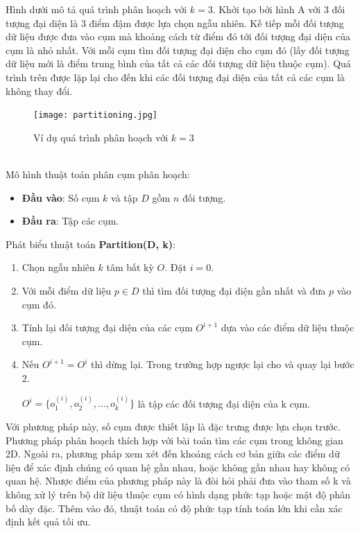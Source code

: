 \documentclass{article}
\begin{document}
    Hình dưới mô tả quá trình phân hoạch với $k=3$. Khởi tạo bởi hình A với 3 đối tượng đại diện là 3 điểm đậm được lựa chọn ngẫu nhiên. Kế tiếp mỗi đối tượng dữ liệu được đưa vào cụm mà khoảng cách từ điểm đó tới đối tượng đại diện của cụm là nhỏ nhất. Với mỗi cụm tìm đối tượng đại diện cho cụm đó (lấy đối tượng dữ liệu mới là điểm trung bình của tất cả các đối tượng dữ liệu thuộc cụm). Quá trình trên được lặp lại cho đến khi các đối tượng đại diện của tất cả các cụm là không thay đổi.
    \begin{figure}[H]
        \centering            \texttt{[image: partitioning.jpg]} \\
        \caption{Ví dụ quá trình phân hoạch với $k = 3$}
        \label{fig:partitioning_ex}
    \end{figure}
    \\
    Mô hình thuật toán phân cụm phân hoạch:
    \begin{itemize}
        \item \textbf{Đầu vào}: Số cụm $k$ và tập $D$ gồm $n$ đối tượng.
        \item \textbf{Đầu ra}: Tập các cụm.
    \end{itemize}
    
    Phát biểu thuật toán \textbf{Partition(D, k)}:
    \begin{enumerate}
        \item Chọn ngẫu nhiên $k$ tâm bất kỳ $O$. Đặt $i=0$.
        \item Với mỗi điểm dữ liệu $p \in D$ thì tìm đối tượng đại diện gần nhất và đưa $p$ vào cụm đó.
        \item Tính lại đối tượng đại diện của các cụm $O^{i+1}$ dựa vào các điểm dữ liệu thuộc cụm.
        \item Nếu $O^{i+1} = O^i$ thì dừng lại. Trong trường hợp ngược lại cho   và quay lại bước 2. 
        
        $O^i = \{ o_1^{(i)},o_2^{(i)},...,o_k^{(i)} \}$ là tập các đối tượng đại diện của k cụm.
    \end{enumerate}

    Với phương pháp này, số cụm được thiết lập là đặc trưng được lựa chọn trước. Phương pháp phân hoạch thích hợp với bài toán tìm các cụm trong không gian 2D. Ngoài ra, phương pháp xem xét đến khoảng cách cơ bản giữa các điểm dữ liệu để xác định chúng có quan hệ gần nhau, hoặc không gần nhau hay không có quan hệ. Nhược điểm của phương pháp này là đòi hỏi phải đưa vào tham số k và không xử lý trên bộ dữ liệu thuộc cụm có hình dạng phức tạp hoặc mật độ phân bố dày đặc. Thêm vào đó, thuật toán có độ phức tạp tính toán lớn khi cần xác định kết quả tối ưu.
\end{document}
